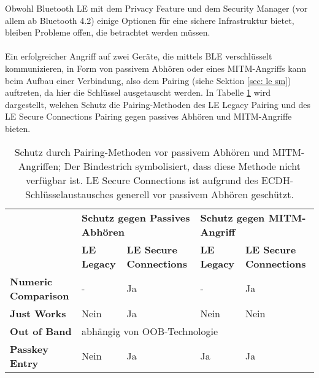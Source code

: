 Obwohl Bluetooth LE mit dem Privacy Feature und dem Security Manager (vor allem ab Bluetooth 4.2) einige Optionen für eine sichere Infrastruktur bietet, bleiben Probleme offen, die betrachtet werden müssen.
\\\\
Ein erfolgreicher Angriff auf zwei Geräte, die mittels BLE verschlüsselt kommunizieren, in Form von passivem Abhören oder eines MITM-Angriffs kann beim Aufbau einer Verbindung, also dem Pairing (siehe Sektion \ref{sec: le sm}) auftreten, da hier die Schlüssel ausgetauscht werden. In Tabelle \ref{tab: le sicherheit zusammenfassung}
wird dargestellt, welchen Schutz die Pairing-Methoden des LE Legacy Pairing und des LE Secure Connections Pairing gegen passives Abhören und MITM-Angriffe bieten.

\begin{table}
    \begin{tabularx}{\textwidth}{|p{2.8cm}|p{2cm}|p{3cm}|p{2cm}|p{3cm}|}
        \hline
        & \multicolumn{2}{X|}{\textbf{Schutz gegen Passives Abhören}} & \multicolumn{2}{X|}{\textbf{Schutz gegen MITM-Angriff}} \\
        & \textbf{LE Legacy} & \textbf{LE Secure Connections} & \textbf{LE Legacy} & \textbf{LE Secure Connections} \\
        \hline
        \textbf{Numeric Comparison} & - & Ja & - & Ja \cite{BtSpec4.2_2309} \\
        \hline
        \textbf{Just Works} & Nein \cite{BtSpec4.2_2304_b} & Ja \cite{BtSpec4.2_245} & Nein \cite{BtSpec4.2_2304_b} & Nein \cite{BtSpec4.2_245} \\
        \hline
        \textbf{Out of Band} & \multicolumn{4}{|l|}{abhängig von OOB-Technologie \cite{BtSpec4.2_2305} \cite{BtSpec4.2_2312-2313}} \\
        \hline
        \textbf{Passkey Entry} & Nein \cite{BtSpec4.2_2304} & Ja & Ja \cite{BtSpec4.2_2304} & Ja \cite{BtSpec4.2_2311}\\
        \hline
    \end{tabularx}
    \caption[Schutz durch Pairing-Methoden vor passivem Abhören und MITM]{Schutz durch Pairing-Methoden vor passivem Abhören und MITM-Angriffen; Der Bindestrich symbolisiert, dass diese Methode nicht verfügbar ist. LE Secure Connections ist aufgrund des ECDH-Schlüsselaustausches \cite{BtSpec4.2_2307} generell vor passivem Abhören geschützt.}
    \label{tab: le sicherheit zusammenfassung}
\end{table}

